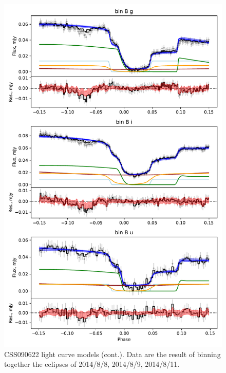 \begin{figure}
    \centering
    \includegraphics[width=\textwidth]{figures/results/CSS090622/CSS090622_2.pdf}
    \caption{CSS090622 light curve models (cont.). Data are the result of binning together the eclipses of 2014/8/8, 2014/8/9, 2014/8/11.}
    \label{fig:CSS090622 all light curves cont 1}
\end{figure}
